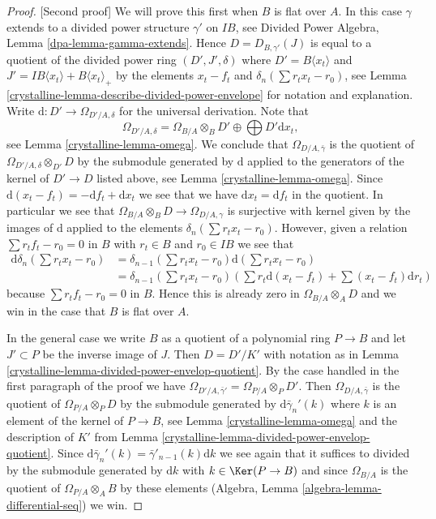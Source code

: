 \begin{proof}
[Second proof]
We will prove this first when $B$ is flat over $A$. In this case $\gamma$
extends to a divided power structure $\gamma'$ on $IB$, see
Divided Power Algebra, Lemma \ref{dpa-lemma-gamma-extends}.
Hence $D = D_{B, \gamma'}(J)$ is equal to a quotient of
the divided power ring $(D', J', \delta)$ where $D' =  B\langle x_t \rangle$
and $J' = IB\langle x_t \rangle + B\langle x_t \rangle_{+}$
by the elements $x_t - f_t$ and $\delta_n(\sum r_t x_t - r_0)$, see
Lemma \ref{crystalline-lemma-describe-divided-power-envelope} for notation
and explanation. Write $\text{d} : D' \to \Omega_{D'/A, \delta}$
for the universal derivation. Note that
$$
\Omega_{D'/A, \delta} =
\Omega_{B/A} \otimes_B D' \oplus \bigoplus D' \text{d}x_t,
$$
see Lemma \ref{crystalline-lemma-omega}. We conclude that $\Omega_{D/A, \bar\gamma}$
is the quotient of $\Omega_{D'/A, \delta} \otimes_{D'} D$ by the submodule
generated by $\text{d}$ applied to the generators of the
kernel of $D' \to D$ listed above, see Lemma \ref{crystalline-lemma-omega}.
Since $\text{d}(x_t - f_t) = - \text{d}f_t + \text{d}x_t$
we see that we have $\text{d}x_t = \text{d}f_t$ in the quotient.
In particular we see that $\Omega_{B/A} \otimes_B D \to \Omega_{D/A, \gamma}$
is surjective with kernel given by the images of $\text{d}$
applied to the elements $\delta_n(\sum r_t x_t - r_0)$.
However, given a relation $\sum r_tf_t - r_0 = 0$ in $B$ with
$r_t \in B$ and $r_0 \in IB$ we see that
\begin{align*}
\text{d}\delta_n(\sum r_t x_t - r_0)
& =
\delta_{n - 1}(\sum r_t x_t - r_0)\text{d}(\sum r_t x_t - r_0)
\\
& =
\delta_{n - 1}(\sum r_t x_t - r_0)
\left(
\sum r_t\text{d}(x_t - f_t) + \sum (x_t - f_t)\text{d}r_t
\right)
\end{align*}
because $\sum r_tf_t - r_0 = 0$ in $B$. Hence this is already zero in
$\Omega_{B/A} \otimes_A D$ and we win in the case that $B$ is flat over $A$.

\medskip\noindent
In the general case we write $B$ as a quotient of a polynomial ring
$P \to B$ and let $J' \subset P$ be the inverse image of $J$. Then
$D = D'/K'$ with notation as in
Lemma \ref{crystalline-lemma-divided-power-envelop-quotient}.
By the case handled in the first paragraph of the proof we have
$\Omega_{D'/A, \bar\gamma'} = \Omega_{P/A} \otimes_P D'$. Then
$\Omega_{D/A, \bar \gamma}$ is the quotient of $\Omega_{P/A} \otimes_P D$
by the submodule generated by $\text{d}\bar\gamma_n'(k)$ where $k$
is an element of the kernel of $P \to B$, see
Lemma \ref{crystalline-lemma-omega} and the description of $K'$ from
Lemma \ref{crystalline-lemma-divided-power-envelop-quotient}. Since
$\text{d}\bar\gamma_n'(k) = \bar\gamma'_{n - 1}(k)\text{d}k$ we see
again that it suffices to divided by the submodule generated by
$\text{d}k$ with $k \in \Ker(P \to B)$ and since $\Omega_{B/A}$
is the quotient of $\Omega_{P/A} \otimes_A B$ by these elements
(Algebra, Lemma \ref{algebra-lemma-differential-seq}) we win.
\end{proof}

